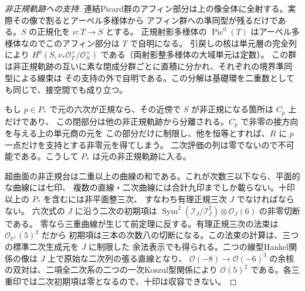 \begin{proof}[非正規軌跡への支持]
連結Picard群のアフィン部分は上の像全体に全射する。実際その像で割るとアーベル多様体から
アフィン群への準同型が残るだけである。$S$ の正規化を $\nu:T\to S$ とする。
正規射影多様体の $\operatorname{Pic}^0(T)$ はアーベル多様体なのでこのアフィン部分は $T$ で自明になる。
引戻しの核は単元層の完全列により
$H^0(S,\nu_*\mathcal O_T^\times/\mathcal O_S^\times)$ である（両射影整多様体の大域単元は定数）。
この群は非正規軌跡の互いに素な閉成分群ごとに直積に分かれ、それぞれの境界準同型による線束は
その支持の外で自明である。この分解は基礎環を二重数としても同じで、接空間でも成り立つ。

もし $p\in P_*$ で元の六次が正規なら、その近傍で $S$ が非正規になる箇所は $C_p$ 上だけであり、
この閉部分は他の非正規軌跡から分離される。$C_p$ で非零の接方向を与える上の単元商の元を
この部分だけに制限し、他を恒等とすれば、$R$ に $p$ 一点だけを支持とする非零元を得てしまう。
二次評価の列は零でないので不可能である。こうして $P_*$ は元の非正規軌跡に入る。

超曲面の非正規台は二重以上の曲線の和である。これが次数三以下なら、平面的な曲線には七印、
複数の直線・二次曲線には合計九印までしか載らない。十印以上の $P_*$ を含むには非平面整三次、
すなわち有理正規三次 $J$ でなければならない。
六次式の $J$ に沿う二次の初期項は
$\operatorname{Sym}^2(\mathcal I_J/\mathcal I_J^2)\otimes\mathcal O_J(6)$ の非零切断である。
零なら三重曲線が生じて前定理に反する。有理正規三次の法束は $\mathcal O_{\mathbb P^1}(5)^2$ だから
初期項は三本の次数八の切断になる。この法束の計算は、三つの標準二次生成元を $J$ に制限した
余法表示でも得られる。二つの線型Hankel関係の像は $J$ 上で原始な二次列の張る直線となり、
$\mathcal O(-8)\to\mathcal O(-6)^3$ の余核の双対は、二項全二次系の二つの一次Koszul型関係により
$\mathcal O(5)^2$ である。各三重印では二次初期項は零となるので、十印は収容できない。
\end{proof}
